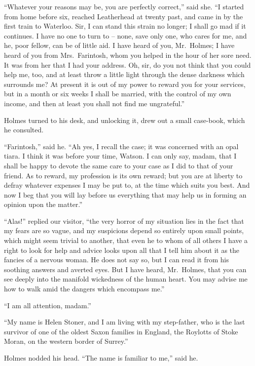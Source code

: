 “Whatever your reasons may be, you are perfectly correct,”
said she. “I started from home before six, reached Leatherhead
at twenty past, and came in by the first train to Waterloo.
Sir, I can stand this strain no longer; I shall go mad if
it continues. I have no one to turn to -- none, save only one,
who cares for me, and he, poor fellow, can be of little aid. I
have heard of you, Mr.~Holmes; I have heard of you from
Mrs.~Farintosh, whom you helped in the hour of her sore need.
It was from her that I had your address. Oh, sir, do you not
think that you could help me, too, and at least throw a little
light through the dense darkness which surrounds me? At
present it is out of my power to reward you for your services,
but in a month or six weeks I shall be married, with the
control of my own income, and then at least you shall not find
me ungrateful.”

Holmes turned to his desk, and unlocking it, drew out a
small case-book, which he consulted.

“Farintosh,” said he. “Ah yes, I recall the case; it was
concerned with an opal tiara. I think it was before your
time, Watson. I can only say, madam, that I shall be happy
to devote the same care to your case as I did to that of your
friend. As to reward, my profession is its own reward; but
you are at liberty to defray whatever expenses I may be put
to, at the time which suits you best. And now I beg that you
will lay before us everything that may help us in forming an
opinion upon the matter.”

“Alas!” replied our visitor, “the very horror of my situation
lies in the fact that my fears are so vague, and my suspicions
depend so entirely upon small points, which might seem
trivial to another, that even he to whom of all others I have a
right to look for help and advice looks upon all that I tell him
about it as the fancies of a nervous woman. He does not
say so, but I can read it from his soothing answers and averted
eyes. But I have heard, Mr.~Holmes, that you can see
deeply into the manifold wickedness of the human heart.
You may advise me how to walk amid the dangers which encompass
me.”

“I am all attention, madam.”

“My name is Helen Stoner, and I am living with my step-father,
who is the last survivor of one of the oldest Saxon families
in England, the Roylotts of Stoke Moran, on the western
border of Surrey.”

Holmes nodded his head. “The name is familiar to me,”
said he.

